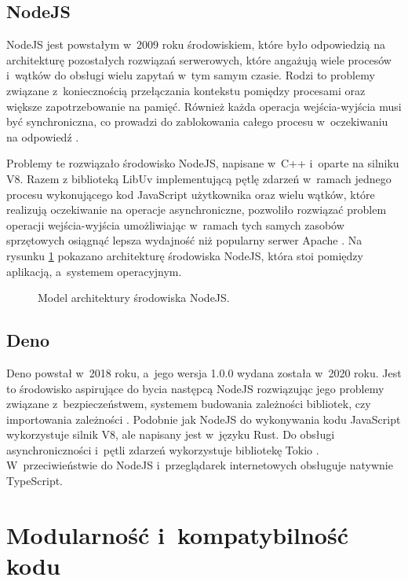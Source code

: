 \subsection{NodeJS}

NodeJS jest powstałym w~2009 roku środowiskiem, które było odpowiedzią na architekturę pozostałych rozwiązań serwerowych, które angażują wiele procesów i~wątków do obsługi wielu zapytań w~tym samym czasie. Rodzi to problemy związane z~koniecznością przełączania kontekstu pomiędzy procesami oraz większe zapotrzebowanie na pamięć. Również każda operacja wejścia-wyjścia musi być synchroniczna, co prowadzi do zablokowania całego procesu w~oczekiwaniu na odpowiedź \cite{nodejs}.

Problemy te rozwiązało środowisko NodeJS, napisane w~C++ i~oparte na silniku V8. Razem z biblioteką LibUv \cite{libuv} implementującą pętlę zdarzeń w~ramach jednego procesu wykonującego kod JavaScript użytkownika oraz wielu wątków, które realizują oczekiwanie na operacje asynchroniczne, pozwoliło rozwiązać problem operacji wejścia-wyjścia umożliwiając w~ramach tych samych zasobów sprzętowych osiągnąć lepsza wydajność niż popularny serwer Apache \cite{node-apache}. Na rysunku \ref{fig:nodejs} pokazano architekturę środowiska NodeJS, która stoi pomiędzy aplikacją, a~systemem operacyjnym.

\begin{figure}[ht]
    \centering
     
    \caption{Model architektury środowiska NodeJS.}
    \label{fig:nodejs}
\end{figure}

\subsection{Deno}

Deno powstał w~2018 roku, a~jego wersja 1.0.0 wydana została w~2020 roku. Jest to środowisko aspirujące do bycia następcą NodeJS rozwiązując jego problemy związane z~bezpieczeństwem, systemem budowania zależności bibliotek, czy importowania zależności \cite{deno}. Podobnie jak NodeJS do wykonywania kodu JavaScript wykorzystuje silnik V8, ale napisany jest w~języku Rust. Do obsługi asynchroniczności i~pętli zdarzeń wykorzystuje bibliotekę Tokio \cite{tokio}. W~przeciwieństwie do NodeJS i~przeglądarek internetowych obsługuje natywnie TypeScript.

\section{Modularność i~kompatybilność kodu}

